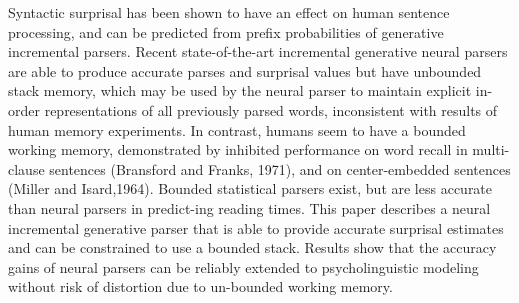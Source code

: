 Syntactic surprisal has been shown to have an effect on human sentence processing, and can be predicted from prefix probabilities of generative incremental parsers.   Recent state-of-the-art incremental generative neural parsers are able to produce accurate parses and surprisal values but have unbounded stack memory,  which may be used by the neural parser to maintain explicit in-order representations of all previously parsed words, inconsistent with results of human memory experiments. In contrast, humans seem to have a bounded working memory,  demonstrated by inhibited performance on word recall in multi-clause sentences (Bransford and Franks, 1971),  and on center-embedded sentences (Miller and Isard,1964). Bounded statistical parsers exist,  but are less accurate than neural parsers in predict-ing reading times. This paper describes a neural incremental generative parser that is able to provide accurate surprisal estimates and can be constrained to use a bounded stack. Results show that the accuracy gains of neural parsers can be reliably extended to psycholinguistic modeling without risk of distortion due to un-bounded working memory.
